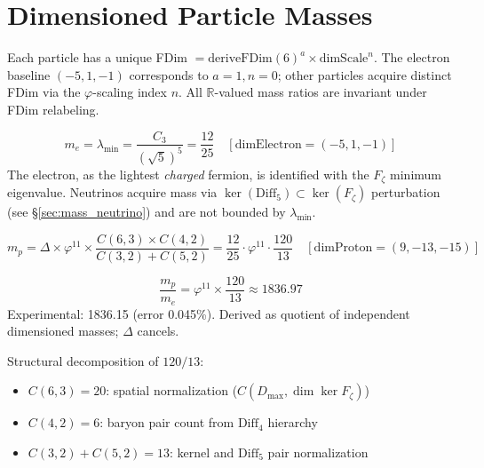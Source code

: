 \section{Dimensioned Particle Masses}
\label{sec:mass_dimensioned}

Each particle has a unique FDim $= \mathrm{deriveFDim}(6)^a \times \mathrm{dimScale}^n$.
The electron baseline $(-5, 1, -1)$ corresponds to $a=1, n=0$;
other particles acquire distinct FDim via the $\varphi$-scaling index $n$.
All $\mathbb{R}$-valued mass ratios are invariant under FDim relabeling.

\begin{theorem}
\label{thm:mass_electron}
\leanok
\[
m_e = \lambda_{\min} = \frac{C_3}{(\sqrt{5})^5} = \frac{12}{25} \quad [\mathrm{dimElectron} = (-5,1,-1)]
\]
The electron, as the lightest \emph{charged} fermion, is identified with the $F_\zeta$ minimum eigenvalue. Neutrinos acquire mass via $\ker(\mathrm{Diff}_5) \subset \ker(F_\zeta)$ perturbation (see \S\ref{sec:mass_neutrino}) and are not bounded by $\lambda_{\min}$.
\end{theorem}

\begin{theorem}
\label{thm:mass_proton}
\leanok
\[
m_p = \Delta \times \varphi^{11} \times \frac{C(6,3) \times C(4,2)}{C(3,2)+C(5,2)} = \frac{12}{25} \cdot \varphi^{11} \cdot \frac{120}{13} \quad [\mathrm{dimProton} = (9,-13,-15)]
\]
\end{theorem}

\begin{theorem}
\label{thm:mass_pe}
\leanok
\[
\frac{m_p}{m_e} = \varphi^{11} \times \frac{120}{13} \approx 1836.97
\]
Experimental: 1836.15 (error 0.045\%). Derived as quotient of independent dimensioned masses; $\Delta$ cancels.
\end{theorem}

Structural decomposition of $120/13$:
\begin{itemize}
\item $C(6,3) = 20$: spatial normalization ($C(D_{\max}, \dim\ker F_\zeta)$)
\item $C(4,2) = 6$: baryon pair count from $\mathrm{Diff}_4$ hierarchy
\item $C(3,2)+C(5,2) = 13$: kernel and $\mathrm{Diff}_5$ pair normalization
\end{itemize}

